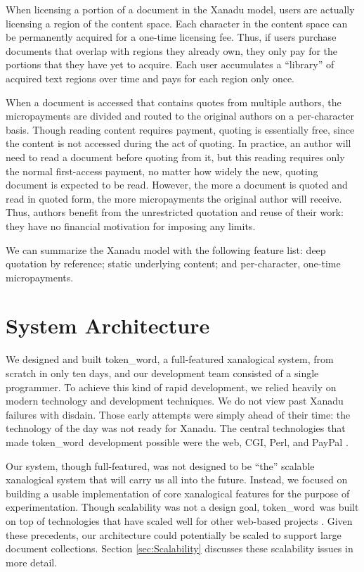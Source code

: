 \documentclass{acm_proc_article-sp}
\newcommand{\tokenWord}{token\_word}
\begin{document}
When licensing a portion of a document in the Xanadu model, users are actually licensing a region of the content space.
Each character in the content space can be permanently acquired for a one-time licensing fee.
Thus, if users purchase documents that overlap with regions they already own, they only pay for the portions that they have yet to acquire.
Each user accumulates a ``library'' of acquired text regions over time and pays for each region only once.

When a document is accessed that contains quotes from multiple authors, the micropayments are divided and routed to the original authors on a per-character basis. 
Though reading content requires payment, quoting is essentially free, since the content is not accessed during the act of quoting.
In practice, an author will need to read a document before quoting from it, but this reading requires only the normal first-access payment, no matter how widely the new, quoting document is expected to be read.
However, the more a document is quoted and read in quoted form, the more micropayments the original author will receive.
Thus, authors benefit from the unrestricted quotation and reuse of their work:  they have no financial motivation for imposing any limits.

We can summarize the Xanadu model with the following feature list:  deep quotation by reference; static underlying content; and per-character, one-time micropayments.


\section{System Architecture}
We designed and built \tokenWord, a full-featured xanalogical system, from scratch in only ten days, and our development team consisted of a single programmer.
To achieve this kind of rapid development, we relied heavily on modern technology and development techniques.
We do not view past Xanadu failures with disdain.
Those early attempts were simply ahead of their time:  the technology of the day was not ready for Xanadu.
The central technologies that made \tokenWord \   development possible were the web, CGI, Perl, and PayPal \cite{paypal}.

Our system, though full-featured, was not designed to be ``the'' scalable xanalogical system that will carry us all into the future.
Instead, we focused on building a usable implementation of core xanalogical features for the purpose of experimentation.
Though scalability was not a design goal, \tokenWord \  was built on top of technologies that have scaled well for other web-based projects \cite{Everything2, WikiWikiWeb, Wikipedia}.
Given these precedents, our architecture could potentially be scaled to support large document collections.
Section \ref{sec:Scalability} discusses these scalability issues in more detail.
\end{document}
